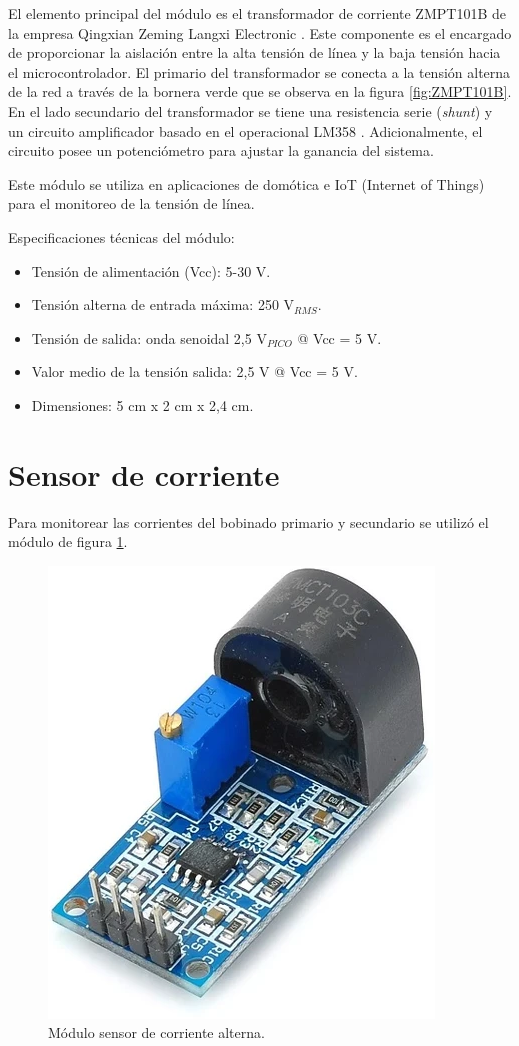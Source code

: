 El elemento principal del módulo es el transformador de corriente ZMPT101B de la empresa Qingxian Zeming Langxi Electronic \citep{ZMPT101B_b}. Este componente es el encargado de proporcionar la aislación entre la alta tensión de línea y la baja tensión hacia el microcontrolador. El primario del transformador se conecta a la tensión alterna de la red a través de la bornera verde que se observa en la figura \ref{fig:ZMPT101B}. En el lado secundario del transformador se tiene una resistencia serie (\textit{shunt}) y un circuito amplificador basado en el operacional LM358 \citep{LM358}. Adicionalmente, el circuito posee un potenciómetro para ajustar la ganancia del sistema.

Este módulo se utiliza en aplicaciones de domótica e IoT (Internet of Things) para el monitoreo de la tensión de línea.

Especificaciones técnicas del módulo: 
\begin{itemize}
\item Tensión de alimentación (Vcc): 5-30 V.
\item Tensión alterna de entrada máxima: 250 V$_{RMS}$.
\item Tensión de salida: onda senoidal 2,5 V$_{PICO}$ @ Vcc = 5 V.
\item Valor medio de la tensión salida: 2,5 V @ Vcc = 5 V.
\item Dimensiones: 5 cm x 2 cm x 2,4 cm.
\end{itemize}

\section{Sensor de corriente}
\label{sec:secZMCT103C}

Para monitorear las corrientes del bobinado primario y secundario se utilizó el módulo de figura \ref{fig:ZMCT103C}.

\begin{figure}[htpb]
	\centering
	\includegraphics[scale=.5]{./Figures/ZMCT103C.png}
	\caption{Módulo sensor de corriente alterna.}
	\label{fig:ZMCT103C}
\end{figure}

